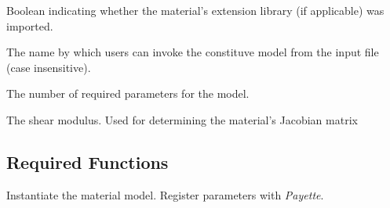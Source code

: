 \documentclass[letterpaper,10pt,english]{sphinxmanual}
\begin{document}
\begin{fulllineitems}
\label{Files/installing_materials:MaterialModel.imported}
Boolean indicating whether the material's extension library (if applicable)
was imported.

\end{fulllineitems}


\begin{fulllineitems}
\label{Files/installing_materials:MaterialModel.name}
The name by which users can invoke the constituve model from the input file
(case insensitive).

\end{fulllineitems}


\begin{fulllineitems}
\label{Files/installing_materials:MaterialModel.nprop}
The number of required parameters for the model.

\end{fulllineitems}


\begin{fulllineitems}
\label{Files/installing_materials:MaterialModel.shear_modulus}
The shear modulus.  Used for determining the material's Jacobian matrix

\end{fulllineitems}



\subsection{Required Functions}
\label{Files/installing_materials:required-functions}

\begin{fulllineitems}
\label{Files/installing_materials:MaterialModel.__init__}
Instantiate the material model.  Register parameters with \emph{Payette}.

\end{fulllineitems}
\end{document}
